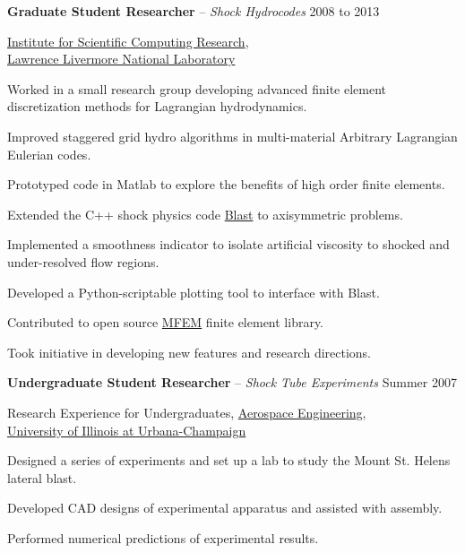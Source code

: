 \documentclass[10pt]{article}
\newenvironment{innerlist}[1][\enskip\textbullet]%
        {\begin{compactitem}[#1]}{\end{compactitem}}
\begin{document}
\textbf{Graduate Student Researcher} -- \emph{Shock Hydrocodes} \hfill {2008 to 2013}
\begin{innerlist}

\item[] \href{http://iscr.llnl.gov/}{Institute for Scientific Computing Research},\\
        \href{http://www.llnl.gov/}{Lawrence Livermore National Laboratory}
\begin{innerlist}
\item Worked in a small research group developing advanced finite element discretization methods for Lagrangian hydrodynamics.
\item Improved staggered grid hydro algorithms in multi-material Arbitrary Lagrangian Eulerian codes.
\item Prototyped code in Matlab to explore the benefits of high order finite elements.
\item Extended the C++ shock physics code \href{https://computation.llnl.gov/casc/blast/blast.html}{Blast} to axisymmetric problems.
\item Implemented a smoothness indicator to isolate artificial viscosity to shocked and under-resolved flow regions.
\item Developed a Python-scriptable plotting tool to interface with Blast.
\item Contributed to open source \href{http://www.mfem.org/}{MFEM} finite element library.
\item Took initiative in developing new features and research directions.
\end{innerlist}
\end{innerlist}

\bigskip

\textbf{Undergraduate Student Researcher} -- \emph{Shock Tube Experiments} \hfill {Summer 2007}
\begin{innerlist}

\item[] {Research Experience for Undergraduates},
        \href{http://www.ae.uiuc.edu/}{Aerospace Engineering},\\
        \href{http://www.uiuc.edu/}{University of Illinois at Urbana-Champaign}
\begin{innerlist}
\item Designed a series of experiments and set up a lab to study the Mount St. Helens lateral blast.
\item Developed CAD designs of experimental apparatus and assisted with assembly.
\item Performed numerical predictions of experimental results.
\end{innerlist}
\end{innerlist}
\end{document}
